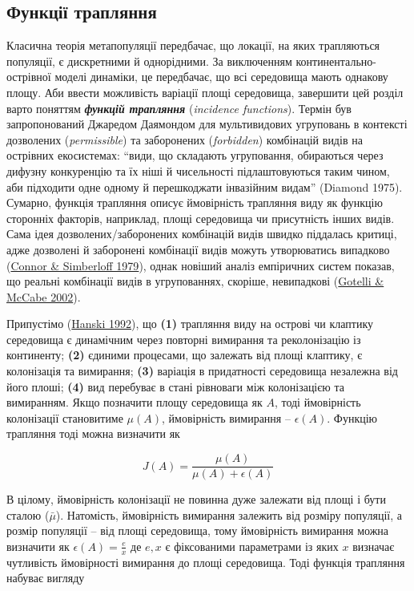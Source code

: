\documentclass[
  11pt,
]{book}
\begin{document}
\subsection{Функції трапляння}\label{ux444ux443ux43dux43aux446ux456ux457-ux442ux440ux430ux43fux43bux44fux43dux43dux44f}

Класична теорія метапопуляції передбачає, що локації, на яких трапляються популяції, є дискретними й однорідними. За виключенням континентально-острівної моделі динаміки, це передбачає, що всі середовища мають однакову площу. Аби ввести можливість варіації площі середовища, завершити цей розділ варто поняттям \textbf{\emph{функцій трапляння}} (\emph{incidence functions}). Термін був запропонований Джаредом Даямондом для мультивидових угруповань в контексті дозволених (\emph{permissible}) та заборонених (\emph{forbidden}) комбінацій видів на острівних екосистемах: ``види, що складають угруповання, обираються через дифузну конкуренцію та їх ніші й чисельності підлаштовуються таким чином, аби підходити одне одному й перешкоджати інвазійним видам'' (Diamond 1975). Сумарно, функція трапляння описує ймовірність трапляння виду як функцію сторонніх факторів, наприклад, площі середовища чи присутність інших видів. Сама ідея дозволених/заборонених комбінацій видів швидко піддалась критиці, адже дозволені й заборонені комбінації видів можуть утворюватись випадково (\href{htpps://doi.org/10.2307/1936961}{Connor \& Simberloff 1979}), однак новіший аналіз емпіричних систем показав, що реальні комбінації видів в угрупованнях, скоріше, невипадкові (\href{http://doi.wiley.com/10.1890/0012-9658(2002)083\%5B2091:SCOAMA\%5D2.0.CO;2}{Gotelli \& McCabe 2002}).

Припустімо (\href{https://www.jstor.org/stable/2462503}{Hanski 1992}), що \textbf{(1)} трапляння виду на острові чи клаптику середовища є динамічним через повторні вимирання та реколонізацію із континенту; \textbf{(2)} єдиними процесами, що залежать від площі клаптику, є колонізація та вимирання; \textbf{(3)} варіація в придатності середовища незалежна від його плоші; \textbf{(4)} вид перебуває в стані рівноваги між колонізацією та вимиранням. Якщо позначити площу середовища як \(A\), тоді ймовірність колонізації становитиме \(\mu(A)\), ймовірність вимирання -- \(\epsilon(A)\). Функцію трапляння тоді можна визначити як

\[J(A) = \frac{\mu(A)}{\mu(A) + \epsilon(A)}\]

В цілому, ймовірність колонізації не повинна дуже залежати від площі і бути сталою (\(\bar{\mu}\)). Натомість, ймовірність вимирання залежить від розміру популяції, а розмір популяції -- від площі середовища, тому ймовірність вимирання можна визначити як \(\epsilon(A) = \frac{e}{x}\) де \({e, x}\) є фіксованими параметрами із яких \(x\) визначає чутливість ймовірності вимирання до площі середовища. Тоді функція трапляння набуває вигляду
\end{document}
